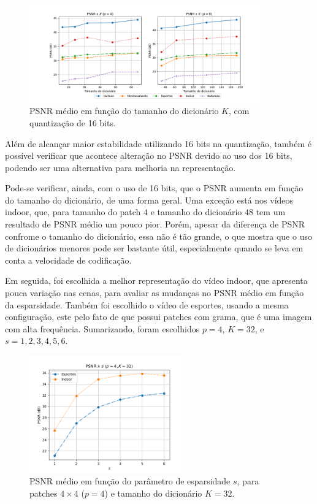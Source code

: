 \documentclass[cic,tc]{iiufrgs}
\begin{document}
\begin{figure}[H]
    \caption{PSNR médio em função do tamanho do dicionário $K$, com quantização de 16 bits.}
    \begin{center}
        \includegraphics[width=0.9\textwidth]{img/graficos/ds_psnr_16bit.png}
    \end{center}
    \label{fig:psnr16bit}
\end{figure}

Além de alcançar maior estabilidade utilizando 16 bits na quantização, 
também é possível verificar que acontece alteração no PSNR devido ao uso 
dos 16 bits, podendo ser uma alternativa para melhoria na representação.

Pode-se verificar, ainda, com o uso de 16 bits, que o PSNR aumenta em função 
do tamanho do dicionário, de uma forma geral.
Uma exceção está nos vídeos indoor, que, para tamanho do patch $4$ e tamanho do dicionário $48$
tem um resultado de PSNR médio um pouco pior.
Porém, apesar da diferença de PSNR confrome o tamanho do dicionário, essa não é 
tão grande, o que mostra que o uso de dicionários menores pode ser bastante útil,
especialmente quando se leva em conta a velocidade de codificação.

Em seguida, foi escolhida a melhor representação do vídeo indoor, que apresenta 
pouca variação nas cenas, para avaliar as mudanças no PSNR médio em função da esparsidade.
Também foi escolhido o vídeo de esportes, usando a mesma configuração, este pelo fato 
de que possui patches com grama, que é uma imagem com alta frequência.
Sumarizando, foram escolhidos $p=4$, $K=32$, e $s=1,2,3,4,5,6$.

\begin{figure}[H]
    \caption{PSNR médio em função do parâmetro de esparsidade $s$, para patches $4\times4$ ($p=4$) e 
    tamanho do dicionário $K=32$.}
    \begin{center}
        \includegraphics[width=0.6\textwidth]{img/graficos/p4d32_sv_psnr.png}
    \end{center}
    \label{fig:psnrsvar}
\end{figure}
\end{document}
